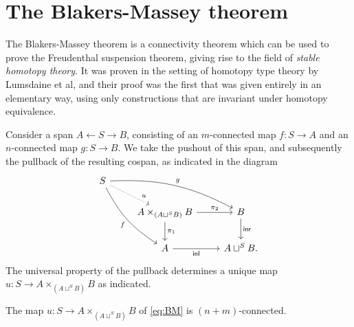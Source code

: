
\section{The Blakers-Massey theorem}
The Blakers-Massey theorem is a connectivity theorem which can be used to prove the Freudenthal suspension theorem, giving rise to the field of \emph{stable homotopy theory}. It was proven in the setting of homotopy type theory by Lumsdaine et al, and their proof was the first that was given entirely in an elementary way, using only constructions that are invariant under homotopy equivalence. 

Consider a span $A \leftarrow S \rightarrow B$, consisting of an $m$-connected map $f:S\to A$ and an $n$-connected map $g:S\to B$. We take the pushout of this span, and subsequently the pullback of the resulting cospan, as indicated in the diagram
\begin{equation}\label{eq:BM}
\begin{tikzcd}
S \arrow[drr,bend left=15,"g"] \arrow[ddr,bend right=15,swap,"f"] \arrow[dr,densely dotted,"u" near end] \\
& A \times_{(A \sqcup^S B)} B \arrow[r,"\pi_2"] \arrow[d,"\pi_1"] & B \arrow[d,"\inr"] \\
& A \arrow[r,swap,"\inl"] & A \sqcup^S B.
\end{tikzcd}
\end{equation}
The universal property of the pullback determines a unique map $u:S\to A \times_{(A\sqcup^S B)} B$ as indicated.

\begin{thm}
The map $u:S\to A \times_{(A\sqcup^S B)} B$ of \cref{eq:BM} is $(n+m)$-connected.
\end{thm}

